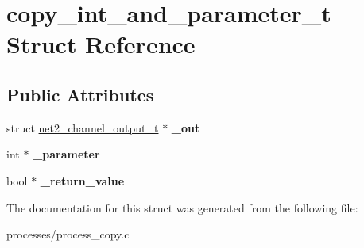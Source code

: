 \hypertarget{structcopy__int__and__parameter__t}{\section{copy\-\_\-int\-\_\-and\-\_\-parameter\-\_\-t Struct Reference}
\label{structcopy__int__and__parameter__t}
}
\subsection*{Public Attributes}
\begin{DoxyCompactItemize}
\item 
\hypertarget{structcopy__int__and__parameter__t_a9775d5ac5976ceaf38b2719f455b7b42}{struct \hyperlink{structnet2__channel__output__t}{net2\-\_\-channel\-\_\-output\-\_\-t} $\ast$ {\bfseries \-\_\-out}}\label{structcopy__int__and__parameter__t_a9775d5ac5976ceaf38b2719f455b7b42}

\item 
\hypertarget{structcopy__int__and__parameter__t_a6c9f9f3e8d273fc0a2336c0e900fb382}{int $\ast$ {\bfseries \-\_\-parameter}}\label{structcopy__int__and__parameter__t_a6c9f9f3e8d273fc0a2336c0e900fb382}

\item 
\hypertarget{structcopy__int__and__parameter__t_ae95f1f2df8e9877a563fe27fc3b0ca28}{bool $\ast$ {\bfseries \-\_\-return\-\_\-value}}\label{structcopy__int__and__parameter__t_ae95f1f2df8e9877a563fe27fc3b0ca28}

\end{DoxyCompactItemize}


The documentation for this struct was generated from the following file\-:\begin{DoxyCompactItemize}
\item 
processes/process\-\_\-copy.\-c\end{DoxyCompactItemize}
